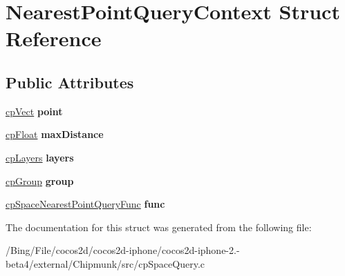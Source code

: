 \hypertarget{struct_nearest_point_query_context}{\section{Nearest\-Point\-Query\-Context Struct Reference}
\label{struct_nearest_point_query_context}
}
\subsection*{Public Attributes}
\begin{DoxyCompactItemize}
\item 
\hypertarget{struct_nearest_point_query_context_a30cb99d0ac7a74d7a416a77417321532}{\hyperlink{structcp_vect}{cp\-Vect} {\bfseries point}}\label{struct_nearest_point_query_context_a30cb99d0ac7a74d7a416a77417321532}

\item 
\hypertarget{struct_nearest_point_query_context_a7cbed8bd6016591bb33342b6f3beb872}{\hyperlink{group__basic_types_gac1ed65573e035bf892505768c852d8d3}{cp\-Float} {\bfseries max\-Distance}}\label{struct_nearest_point_query_context_a7cbed8bd6016591bb33342b6f3beb872}

\item 
\hypertarget{struct_nearest_point_query_context_a3d72ea3a03a0fdc79fc4c31dcb63dbe1}{\hyperlink{group__basic_types_ga5ec31e87ed3973cab80f9bfbbbcb43bb}{cp\-Layers} {\bfseries layers}}\label{struct_nearest_point_query_context_a3d72ea3a03a0fdc79fc4c31dcb63dbe1}

\item 
\hypertarget{struct_nearest_point_query_context_a6f540b5324598cc695dba6280d10a864}{\hyperlink{group__basic_types_gacd811b1135a8f4a3e5cc019552b18b1a}{cp\-Group} {\bfseries group}}\label{struct_nearest_point_query_context_a6f540b5324598cc695dba6280d10a864}

\item 
\hypertarget{struct_nearest_point_query_context_a6ef7f78f3c040ab567b1283ca9496667}{\hyperlink{group__cp_space_gafcaf86d003ff9bc8ed04569ef07030cf}{cp\-Space\-Nearest\-Point\-Query\-Func} {\bfseries func}}\label{struct_nearest_point_query_context_a6ef7f78f3c040ab567b1283ca9496667}

\end{DoxyCompactItemize}


The documentation for this struct was generated from the following file\-:\begin{DoxyCompactItemize}
\item 
/\-Bing/\-File/cocos2d/cocos2d-\/iphone/cocos2d-\/iphone-\/2.-\/beta4/external/\-Chipmunk/src/cp\-Space\-Query.\-c\end{DoxyCompactItemize}
